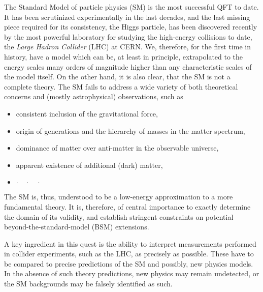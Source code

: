The Standard Model of particle physics (SM) is the most successful QFT to date.
It has been scrutinized experimentally in the last decades, and the
last missing piece required for its consistency, the Higgs particle, has been discovered recently by the most
powerful laboratory for studying  the high-energy collisions to date, the \emph{Large Hadron Collider} (LHC) at CERN.
We, therefore, for the first time in history, have a model which can be, at least in principle, extrapolated to the energy scales many orders of magnitude higher than
any characteristic scales of the model itself.
On the other hand, it is also clear, that the SM is not a complete theory.
The SM fails to address a wide variety of both theoretical concerns and (mostly astrophysical) observations, such as
\begin{itemize}[nosep,topsep=-1.6ex]
  \item consistent inclusion of the gravitational force,
  \item origin of generations and the hierarchy of masses in the matter spectrum,
  \item dominance of matter over anti-matter in the observable universe, 
  \item apparent existence of additional (dark) matter,
  \item[]  $\cdot\quad\cdot\quad\cdot$ %
\end{itemize}
The SM is, thus, understood to be a low-energy approximation to a more fundamental theory.
It is, therefore, of central importance to exactly determine the domain of its validity,
and establish stringent constraints on potential beyond-the-standard-model (BSM) extensions.

A key ingredient in this quest is the ability to interpret measurements performed in collider experiments, such as the LHC, as precisely as possible.
These have to be compared to precise predictions of the SM and possibly, new physics models.
In the absence of such theory predictions, new physics may remain undetected, or the SM backgrounds may be falsely identified as such.

